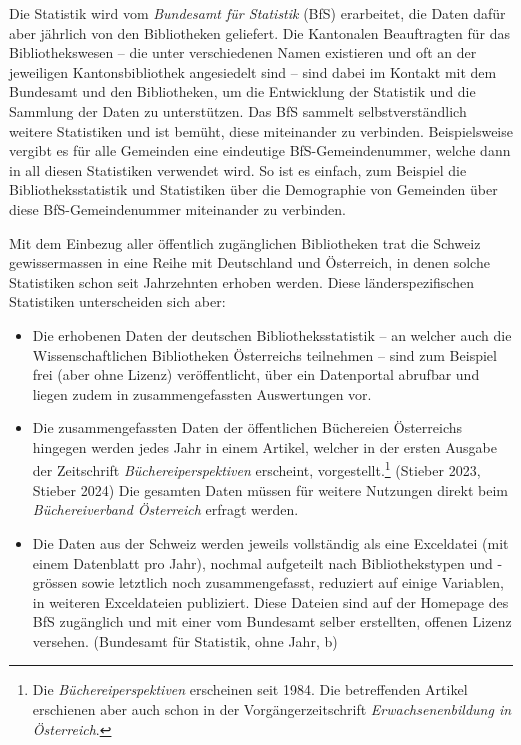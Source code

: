 \documentclass[a4paper,
fontsize=11pt,
oneside,
numbers=noperiodatend,
parskip=half-,
bibliography=totoc,
final
]{scrartcl}
\begin{document}
Die Statistik wird vom \emph{Bundesamt für Statistik} (BfS) erarbeitet,
die Daten dafür aber jährlich von den Bibliotheken geliefert. Die
Kantonalen Beauftragten für das Bibliothekswesen -- die unter
verschiedenen Namen existieren und oft an der jeweiligen
Kantonsbibliothek angesiedelt sind -- sind dabei im Kontakt mit dem
Bundesamt und den Bibliotheken, um die Entwicklung der Statistik und die
Sammlung der Daten zu unterstützen. Das BfS sammelt selbstverständlich
weitere Statistiken und ist bemüht, diese miteinander zu verbinden.
Beispielsweise vergibt es für alle Gemeinden eine eindeutige
BfS-Gemeindenummer, welche dann in all diesen Statistiken verwendet
wird. So ist es einfach, zum Beispiel die Bibliotheksstatistik und
Statistiken über die Demographie von Gemeinden über diese
BfS-Gemeindenummer miteinander zu verbinden.

Mit dem Einbezug aller öffentlich zugänglichen Bibliotheken trat die
Schweiz gewissermassen in eine Reihe mit Deutschland und Österreich, in
denen solche Statistiken schon seit Jahrzehnten erhoben werden. Diese
länderspezifischen Statistiken unterscheiden sich aber:

\begin{itemize}
\item
  Die erhobenen Daten der deutschen Bibliotheksstatistik -- an welcher
  auch die Wissenschaftlichen Bibliotheken Österreichs teilnehmen --
  sind zum Beispiel frei (aber ohne Lizenz) veröffentlicht, über ein
  Datenportal abrufbar und liegen zudem in zusammengefassten
  Auswertungen vor.
\item
  Die zusammengefassten Daten der öffentlichen Büchereien Österreichs
  hingegen werden jedes Jahr in einem Artikel, welcher in der ersten
  Ausgabe der Zeitschrift \emph{Büchereiperspektiven} erscheint,
  vorgestellt.\footnote{Die \emph{Büchereiperspektiven} erscheinen seit
    1984. Die betreffenden Artikel erschienen aber auch schon in der
    Vorgängerzeitschrift \emph{Erwachsenenbildung in Österreich}.}
  (Stieber 2023, Stieber 2024) Die gesamten Daten müssen für weitere
  Nutzungen direkt beim \emph{Büchereiverband Österreich} erfragt
  werden.
\item
  Die Daten aus der Schweiz werden jeweils vollständig als eine
  Exceldatei (mit einem Datenblatt pro Jahr), nochmal aufgeteilt nach
  Bibliothekstypen und -grössen sowie letztlich noch zusammengefasst,
  reduziert auf einige Variablen, in weiteren Exceldateien publiziert.
  Diese Dateien sind auf der Homepage des BfS zugänglich und mit einer
  vom Bundesamt selber erstellten, offenen Lizenz versehen. (Bundesamt
  für Statistik, ohne Jahr, b)
\end{itemize}
\end{document}
